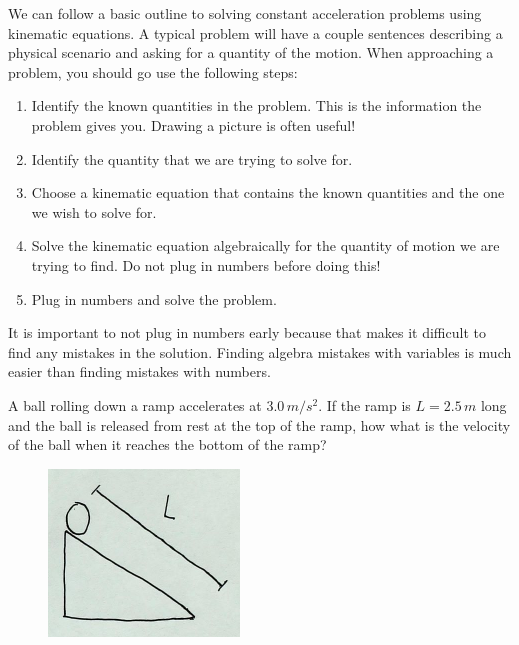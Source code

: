 \documentclass[12pt]{book}
\begin{document}
We can follow a basic outline to solving constant acceleration problems using kinematic equations. A typical problem will have a couple sentences describing a physical scenario and asking for a quantity of the motion. When approaching a problem, you should go use the following steps:

\begin{enumerate}
\item Identify the known quantities in the problem. This is the information the problem gives you. Drawing a picture is often useful!

\item Identify the quantity that we are trying to solve for.

\item Choose a kinematic equation that contains the known quantities and the one we wish to solve for.

\item Solve the kinematic equation algebraically for the quantity of motion we are trying to find. Do not plug in numbers before doing this!

\item Plug in numbers and solve the problem.
\end{enumerate}

It is important to not plug in numbers early because that makes it difficult to find any mistakes in the solution. Finding algebra mistakes with variables is much easier than finding mistakes with numbers.

\linespace

\example

A ball rolling down a ramp accelerates at $3.0 \, m/s^2$. If the ramp is $L = 2.5 \, m$ long and the ball is released from rest at the top of the ramp, how what is the velocity of the ball when it reaches the bottom of the ramp?

\begin{figure}[h]
\centering
\includegraphics[scale=0.8]{example_units_ball_ramp.png}
\end{figure}
\end{document}
